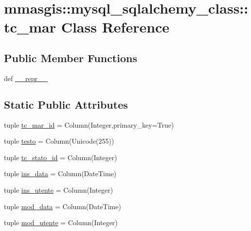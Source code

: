 \hypertarget{classmmasgis_1_1mysql__sqlalchemy__class_1_1tc__mar}{
\section{mmasgis::mysql\_\-sqlalchemy\_\-class::tc\_\-mar Class Reference}
\label{classmmasgis_1_1mysql__sqlalchemy__class_1_1tc__mar}
}
\subsection*{Public Member Functions}
\begin{DoxyCompactItemize}
\item 
def \hyperlink{classmmasgis_1_1mysql__sqlalchemy__class_1_1tc__mar_aaebf453b2082245a4f8175a93d6915ad}{\_\-\_\-repr\_\-\_\-}
\end{DoxyCompactItemize}
\subsection*{Static Public Attributes}
\begin{DoxyCompactItemize}
\item 
tuple \hyperlink{classmmasgis_1_1mysql__sqlalchemy__class_1_1tc__mar_ae2a77eb754df3096723bbe75c3b594bb}{tc\_\-mar\_\-id} = Column(Integer,primary\_\-key=True)
\item 
tuple \hyperlink{classmmasgis_1_1mysql__sqlalchemy__class_1_1tc__mar_a819857ac2fc684cccd14b89c25f23e55}{testo} = Column(Unicode(255))
\item 
tuple \hyperlink{classmmasgis_1_1mysql__sqlalchemy__class_1_1tc__mar_a693976de850cf83b03e7d3d49de0ffd4}{tc\_\-stato\_\-id} = Column(Integer)
\item 
tuple \hyperlink{classmmasgis_1_1mysql__sqlalchemy__class_1_1tc__mar_a639870f4a1f8e8aba110bb0a8d7e4879}{ins\_\-data} = Column(DateTime)
\item 
tuple \hyperlink{classmmasgis_1_1mysql__sqlalchemy__class_1_1tc__mar_ad8bbcbffeef82cb0a885d12744fde3d3}{ins\_\-utente} = Column(Integer)
\item 
tuple \hyperlink{classmmasgis_1_1mysql__sqlalchemy__class_1_1tc__mar_ab73cf169685fdc0608631c400e353b39}{mod\_\-data} = Column(DateTime)
\item 
tuple \hyperlink{classmmasgis_1_1mysql__sqlalchemy__class_1_1tc__mar_acfa294cf8e15e158f907f7425b2b1baa}{mod\_\-utente} = Column(Integer)
\end{DoxyCompactItemize}
